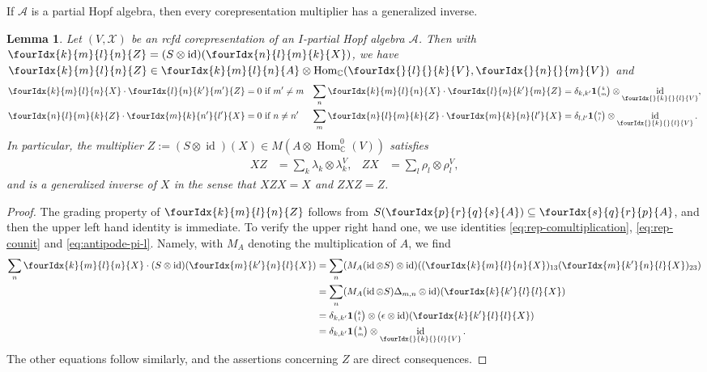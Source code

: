 \documentclass[10pt]{article}
\DeclareMathOperator{\id}{id}
\DeclareMathOperator{\Hom}{Hom}
\newcommand{\C}{\mathbb{C}}
\newcommand{\Grt}[3]{#1{\tiny{\begin{pmatrix} #2\\#3\end{pmatrix}}}}
\newcommand{\UnitC}[2]{\Grt{\mathbf{1}}{#1}{#2}}
\newcommand{\Gr}[5]{\fourIdx{#2}{#4}{#3}{#5}{#1}}%
\newcommand{\Gru}[3]{\Gr{#1}{}{}{#2}{#3}}
\newtheorem{Lem}[Theorem]{Lemma}
\theoremstyle{definition}
\numberwithin{equation}{section}
\begin{document}
If $\mathscr{A}$ is a partial Hopf algebra,  then every
corepresentation multiplier has a generalized inverse.
\begin{Lem} \label{lemma:rep-invertible}
  Let $(V,\mathscr{X})$ be an rcfd corepresentation of an $I$-partial Hopf
  algebra $\mathscr{A}$. Then with $\Gr{Z}{k}{l}{m}{n} = (S\otimes \id)(\Gr{X}{n}{m}{l}{k})$, we have $\Gr{Z}{k}{l}{m}{n}\in \Gr{A}{k}{l}{m}{n}\otimes \Hom_{\C}(\Gru{V}{l}{k},\Gru{V}{n}{m})$ and
  \begin{align*}
    \Gr{X}{k}{l}{m}{n}  \cdot \Gr{Z}{l}{k'}{n}{m'} &=0 \text{ if } m'\neq m &
      \sum_{n} \Gr{X}{k}{l}{m}{n} \cdot \Gr{Z}{l}{k'}{n}{m} &= \delta_{k,k'}\UnitC{k}{m} \otimes
      \id_{\Gru{V}{k}{l}}, \\
      \Gr{Z}{n}{m}{l}{k}\cdot \Gr{X}{m}{n'}{k}{l'} &= 0
      \text{ if } n\neq n' & 
      \sum_{m} \Gr{Z}{n}{m}{l}{k}\cdot \Gr{X}{m}{n}{k}{l'} &=
      \delta_{l,l'} \UnitC{n}{l} \otimes \id_{\Gru{V}{k}{l}}.
  \end{align*}
  In particular, the multiplier $Z:=     (S \otimes
  \id)(X) \in M(A \otimes \Hom_{\C}^{0}(V))$
  satisfies
  \begin{align} \label{eq:rep-generalized-inverse}
    XZ &= \sum_{k} \lambda_{k} \otimes \lambda^{V}_{k}, &
    ZX &= \sum_{l} \rho_{l} \otimes \rho^{V}_{l},
  \end{align}
  and is a generalized inverse of $X$ in the sense that $XZX=X$ and $ZXZ=Z$.
\end{Lem}
\begin{proof}
  The grading property of $\Gr{Z}{k}{l}{m}{n}$ follows from  $S(\Gr{A}{p}{q}{r}{s})\subseteq \Gr{A}{s}{r}{q}{p}$, and then the upper left hand identity is immediate.  To
  verify the upper right hand one, we use identities \eqref{eq:rep-comultiplication}, \eqref{eq:rep-counit} and \eqref{eq:antipode-pi-l}. Namely, with $M_{A}$ denoting the multiplication of $A$, we find
  \begin{align*}
      \sum_{n} \Gr{X}{k}{l}{m}{n} \cdot (S \otimes
      \id)(\Gr{X}{m}{n}{k'}{l}) &= \sum_{n} (M_{A}  (\id \otimes S)
      \otimes \id)((\Gr{X}{k}{l}{m}{n})_{13}(\Gr{X}{m}{n}{k'}{l})_{23})
 \\ &= \sum_{n} (M_{A} (\id \otimes S)  \Delta_{m,n} \otimes
      \id)(\Gr{X}{k}{l}{k'}{l}) \\
      &= \delta_{k,k'} \UnitC{k}{l} \otimes (\epsilon \otimes
      \id)(\Gr{X}{k}{l}{k'}{l})
      \\ &=
\delta_{k,k'}\UnitC{k}{m} \otimes
      \id_{\Gru{V}{k}{l}}. \end{align*} The other
equations follow similarly, and the assertions concerning $Z$ are
direct consequences.
\end{proof}
\end{document}
